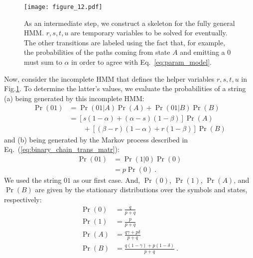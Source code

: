 \documentclass[final,nofootinbib,aps,pre,twocolumn,showpacs,groupaddress,preprintnumbers,floatfix]{revtex4-1}
\begin{document}
\begin{figure}
\centering
\texttt{[image: figure\_12.pdf]}
 \caption{As an intermediate step, we construct a skeleton for the
    fully general HMM. $r,s,t,u$ are temporary variables to be solved
    for eventually. The other transitions are labeled using
    the fact that, for example, the probabilities of the paths coming
    from state $A$ and emitting a $0$ must sum to $\alpha$ in order to
    agree with Eq.~\ref{eq:param_model}.
	}
\label{fig:bmc_pqrstu}
\end{figure}

Now, consider the incomplete HMM that defines the helper variables $r,s,t,u$ in Fig.\nobreakspace \ref {fig:bmc_pqrstu}. To determine the latter's values, we evaluate the probabilities of a string (a) being generated by this incomplete HMM:
\begin{align}
\Pr(01) & = \Pr(01|A)\Pr(A) + \Pr(01|B)\Pr(B) \nonumber \\
        & = [s(1-\alpha) +(\alpha-s)(1-\beta)]\Pr(A) \nonumber \\
        & \qquad + [(\beta-r)(1-\alpha)+r(1-\beta)]\Pr(B)
		\label{eq:pr01a}
\end{align}
and (b) being generated by the Markov process
described in Eq.~(\ref{eq:binary_chain_trans_matr}):
\begin{align}
  \Pr(01) &= \Pr(1|0)\Pr(0) \nonumber \\
          &= p\Pr(0)
		  ~.
\label{eq:pr01b}
\end{align}
We used the string $01$ as our first case. And, $\Pr(0)$,
$\Pr(1)$, $\Pr(A)$, and $\Pr(B)$ are given by the stationary
distributions over the symbols and states, respectively:
\begin{align*}
  \Pr(0) &= \frac{q}{p+q}\\
  \Pr(1) &= \frac{p}{p+q}\\
  \Pr(A) &= \frac{q\gamma + p\delta}{p+q}\\
  \Pr(B) &= \frac{q(1-\gamma)+p(1-\delta)}{p+q}
  ~.
\end{align*}
\end{document}
